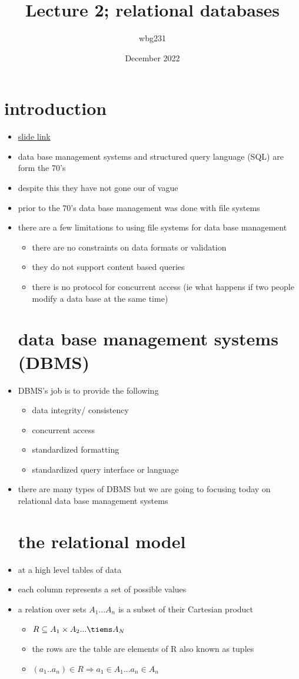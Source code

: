 \documentclass{article}
\title{Lecture 2; relational databases}
\author{wbg231 }
\date{December 2022}
\begin{document}
\maketitle

\section{introduction}
\begin{itemize}
\item \href{https://brightspace.nyu.edu/d2l/le/lessons/261985/topics/8323144}{slide link}
\item data base management systems and structured query language (SQL) are form the 70's 
\item despite this they have not gone our of vague 
\item prior to the 70's data base management was done with file systems 
\item there are a few limitations to using file systems for data base management 
\begin{itemize}
    \item there are no constraints on data formats or validation 
    \item they do not support content based queries 
    \item there is no protocol for concurrent access (ie what happens if two people modify a data base at the same time) 
\end{itemize}
\section{data base management systems (DBMS)}
\item DBMS's job is to provide the following
\begin{itemize}
    \item data integrity/ consistency
    \item concurrent access
    \item standardized formatting 
    \item standardized query interface or language 
\end{itemize}
\item there are many types of DBMS but we are going to focusing today on relational data base management systems 
\section{the relational model}
\item at a high level tables of data
\item each column represents a set of possible values
\item a relation over sets $A_1...A_n$ is a subset of their Cartesian  product 
\begin{itemize}
    \item $R\subseteq A_1\times A_2...\tiems A_N$
    \item the rows are the table are elements of R also known as tuples
    \item $(a_1..a_n)\in R\Rightarrow a_1\in A_1...a_n\in A_n$
\end{itemize}

\end{itemize}
\end{document}
